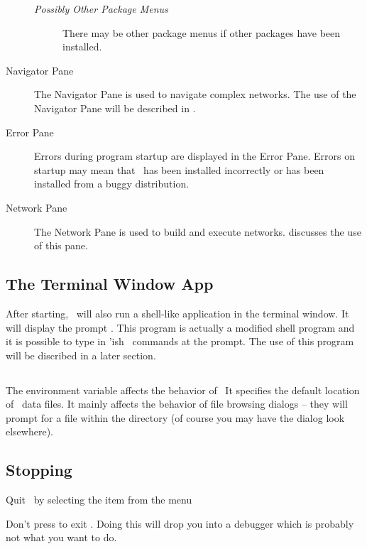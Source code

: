 \begin{description}
  \begin{description}
  \item [\textit{Possibly Other Package Menus}] There may be other package
    menus if other packages have been installed.
  \end{description}

\item[Navigator Pane] The Navigator Pane is used to navigate complex
  networks.  The use of the Navigator Pane will be described in
  .
  
\item[Error Pane] Errors during program startup are displayed in the Error
  Pane.  Errors on startup may mean that \sr\ has been installed
  incorrectly or has been installed from a buggy distribution.
  
\item[Network Pane] The Network Pane is used to build and execute networks.
   discusses the use of this
  pane.

\end{description}

\subsection{The Terminal Window App}
\label{sec:termwinapp}

After starting, \sr\ will also run a shell-like application in the terminal
window.  It will display the prompt .  This program is
actually a modified  shell program and it
is possible to type in 'ish \sr\ commands at the prompt. The
use of this program will be discribed in a later section.


\subsection{}
\label{sec:scirundata}

The environment variable  affects the behavior of \sr\ 
It specifies the default location of \sr\ data files.  It mainly affects
the behavior of file browsing dialogs -- they will prompt for a file within
the \envvar{SCIRUN\_DATA} directory (of course you may have the dialog look
elsewhere).


\subsection{Stopping}
\label{sec:stopping}

Quit \sr\ by selecting the  item from the  menu

Don't press  to exit \sr.  Doing this will drop you into
a debugger which is probably not what you want to do.


